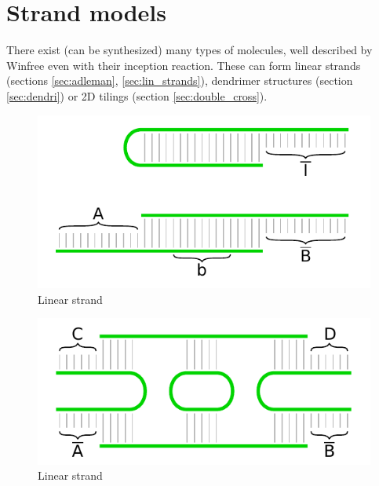 
\section{Strand models}
	
	There exist (can be synthesized) many types of molecules, well described by Winfree \cite{winfree_phd} even with their inception reaction. These can form linear strands (sections \ref{sec:adleman}, \ref{sec:lin_strands}), dendrimer structures (section \ref{sec:dendri}) or 2D tilings (section \ref{sec:double_cross}).
	
	\begin{figure}[H]
	\begin{center}
		\includegraphics{./figures/strand_types/linear.pdf}
		\caption{Linear strand}
	\end{center}
	\end{figure}
	
	\begin{figure}[H]
	\begin{center}
		\includegraphics{./figures/strand_types/double_crossover.pdf}
		\caption{Linear strand}
	\end{center}
	\end{figure}
	
